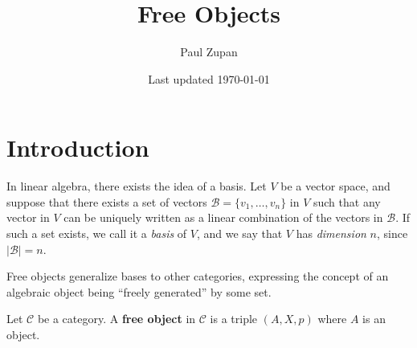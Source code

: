 \documentclass[titlepage]{article}
\title{Free Objects}
\author{Paul Zupan}
\date{Last updated \today}
\begin{document}
\maketitle

\section{Introduction}

In linear algebra, there exists the idea of a basis. Let \(V\) be a vector
space, and suppose that there exists a set of vectors \(\mathcal{B} = \{v_1,
\dots, v_n\}\) in \(V\) such that any vector in \(V\) can be uniquely written
as a linear combination of the vectors in \(\mathcal{B}\). If such a set
exists, we call it a \textit{basis} of \(V\), and we say that \(V\) has
\textit{dimension} \(n\), since \(|\mathcal{B}| = n\).

Free objects generalize bases to other categories, expressing the concept of an
algebraic object being ``freely generated'' by some set.

Let \(\mathcal{C}\) be a category. A \textbf{free object} in \(\mathcal{C}\) is
a triple \((A, X, p)\) where \(A\) is an object.
\end{document}
